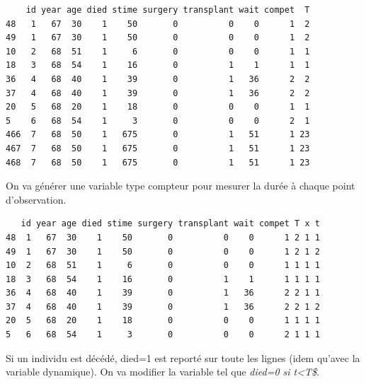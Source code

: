 \documentclass[
  12pt,
  letterpaper,
  DIV=11,
  numbers=noendperiod,
  onepage,
  openany]{scrreprt}
\newenvironment{Shaded}{\begin{snugshade}}{\end{snugshade}}
\newcommand{\AttributeTok}[1]{\textcolor[rgb]{0.80,0.80,0.80}{#1}}
\newcommand{\DecValTok}[1]{\textcolor[rgb]{0.86,0.86,0.80}{#1}}
\newcommand{\FunctionTok}[1]{\textcolor[rgb]{0.94,0.94,0.56}{#1}}
\newcommand{\NormalTok}[1]{\textcolor[rgb]{0.80,0.80,0.80}{#1}}
\newcommand{\OtherTok}[1]{\textcolor[rgb]{0.94,0.94,0.56}{#1}}
\newcommand{\SpecialCharTok}[1]{\textcolor[rgb]{0.86,0.64,0.64}{#1}}
\begin{document}
\begin{verbatim}
    id year age died stime surgery transplant wait compet  T
48   1   67  30    1    50       0          0    0      1  2
49   1   67  30    1    50       0          0    0      1  2
10   2   68  51    1     6       0          0    0      1  1
18   3   68  54    1    16       0          1    1      1  1
36   4   68  40    1    39       0          1   36      2  2
37   4   68  40    1    39       0          1   36      2  2
20   5   68  20    1    18       0          0    0      1  1
5    6   68  54    1     3       0          0    0      2  1
466  7   68  50    1   675       0          1   51      1 23
467  7   68  50    1   675       0          1   51      1 23
468  7   68  50    1   675       0          1   51      1 23
\end{verbatim}

On va générer une variable type compteur pour mesurer la durée à chaque
point d'observation.

\begin{Shaded}
\end{Shaded}

\begin{verbatim}
   id year age died stime surgery transplant wait compet T x t
48  1   67  30    1    50       0          0    0      1 2 1 1
49  1   67  30    1    50       0          0    0      1 2 1 2
10  2   68  51    1     6       0          0    0      1 1 1 1
18  3   68  54    1    16       0          1    1      1 1 1 1
36  4   68  40    1    39       0          1   36      2 2 1 1
37  4   68  40    1    39       0          1   36      2 2 1 2
20  5   68  20    1    18       0          0    0      1 1 1 1
5   6   68  54    1     3       0          0    0      2 1 1 1
\end{verbatim}

Si un individu est décédé, died=1 est reporté sur toute les lignes (idem
qu'avec la variable dynamique). On va modifier la variable tel que
\emph{died=0 si t\textless T\$}.
\end{document}
